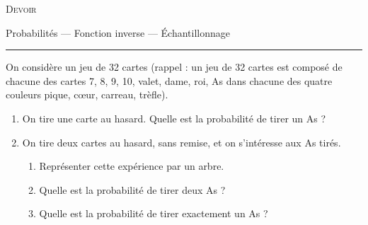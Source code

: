 \documentclass[12pt]{article}
\begin{document}
\begin{center}
  \textsc{Devoir}

  Probabilités --- Fonction inverse --- Échantillonnage
\end{center}
\hrule

\begin{exercice}
  On considère un jeu de 32 cartes (rappel : un jeu de 32 cartes est composé de chacune des cartes 7, 8, 9, 10, valet, dame, roi, As dans chacune des quatre couleurs pique, cœur, carreau, trèfle).
  \begin{enumerate}
    \item On tire une carte au hasard. Quelle est la probabilité de tirer un As ?
    \item On tire deux cartes au hasard, sans remise, et on s'intéresse aux As tirés.
      \begin{enumerate}
        \item Représenter cette expérience par un arbre.
        \item Quelle est la probabilité de tirer deux As ?
        \item Quelle est la probabilité de tirer exactement un As ?
      \end{enumerate}
  \end{enumerate}
\end{exercice}
\end{document}
